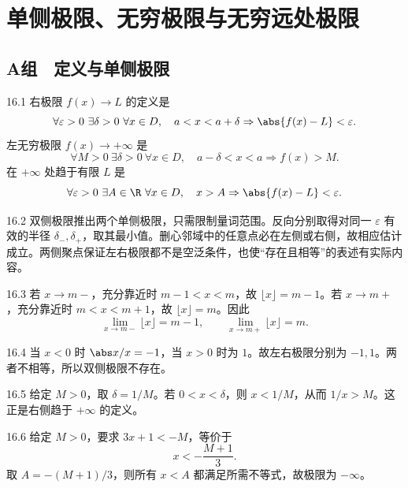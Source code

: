 \chapter{单侧极限、无穷极限与无穷远处极限}

\section*{A组　定义与单侧极限}

\begin{solution}{16.1}
右极限 \(f(x)\to L\) 的定义是
\[
 \forall\varepsilon>0\ \exists\delta>0\ \forall x\in D,\quad
 a<x<a+\delta\Rightarrow\abs{f(x)-L}<\varepsilon.
\]
左无穷极限 \(f(x)\to+\infty\) 是
\[
 \forall M>0\ \exists\delta>0\ \forall x\in D,\quad
 a-\delta<x<a\Rightarrow f(x)>M.
\]
在 \(+\infty\) 处趋于有限 \(L\) 是
\[
 \forall\varepsilon>0\ \exists A\in\R\ \forall x\in D,\quad
 x>A\Rightarrow\abs{f(x)-L}<\varepsilon.
\]
\end{solution}

\begin{solution}{16.2}
双侧极限推出两个单侧极限，只需限制量词范围。反向分别取得对同一 \(\varepsilon\) 有效的半径 \(\delta_-,\delta_+\)，取其最小值。删心邻域中的任意点必在左侧或右侧，故相应估计成立。两侧聚点保证左右极限都不是空泛条件，也使“存在且相等”的表述有实际内容。
\end{solution}

\begin{solution}{16.3}
若 \(x\to m-\)，充分靠近时 \(m-1<x<m\)，故 \(\lfloor x\rfloor=m-1\)。若 \(x\to m+\)，充分靠近时 \(m<x<m+1\)，故 \(\lfloor x\rfloor=m\)。因此
\[
 \lim_{x\to m-}\lfloor x\rfloor=m-1,\qquad
 \lim_{x\to m+}\lfloor x\rfloor=m.
\]
\end{solution}

\begin{solution}{16.4}
当 \(x<0\) 时 \(\abs x/x=-1\)，当 \(x>0\) 时为 \(1\)。故左右极限分别为 \(-1,1\)。两者不相等，所以双侧极限不存在。
\end{solution}

\begin{solution}{16.5}
给定 \(M>0\)，取 \(\delta=1/M\)。若 \(0<x<\delta\)，则 \(x<1/M\)，从而 \(1/x>M\)。这正是右侧趋于 \(+\infty\) 的定义。
\end{solution}

\begin{solution}{16.6}
给定 \(M>0\)，要求 \(3x+1<-M\)，等价于
\[
 x<-\frac{M+1}{3}.
\]
取 \(A=-(M+1)/3\)，则所有 \(x<A\) 都满足所需不等式，故极限为 \(-\infty\)。
\end{solution}

